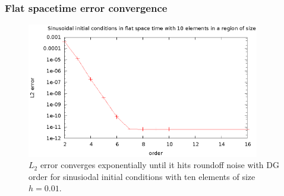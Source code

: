 \documentclass{beamer}
\begin{document}
\begin{frame}
  \frametitle{Flat spacetime error convergence}
  \begin{figure}
    \includegraphics[width=4.0in]{sinL2WTorder}
    \caption{$L_2$ error converges exponentially until it hits roundoff noise with DG order for sinusiodal initial conditions with ten elements of size $h=0.01$.}
  \end{figure}
\end{frame}
\end{document}
